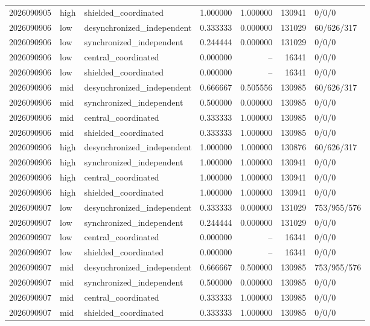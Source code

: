 \begin{longtable}{llp{38mm}rrrp{30mm}}
2026090905 & high & shielded\_coordinated & 1.000000 & 1.000000 & 130941 & 0/0/0 \\
2026090906 & low & desynchronized\_independent & 0.333333 & 0.000000 & 131029 & 60/626/317 \\
2026090906 & low & synchronized\_independent & 0.244444 & 0.000000 & 131029 & 0/0/0 \\
2026090906 & low & central\_coordinated & 0.000000 & -- & 16341 & 0/0/0 \\
2026090906 & low & shielded\_coordinated & 0.000000 & -- & 16341 & 0/0/0 \\
2026090906 & mid & desynchronized\_independent & 0.666667 & 0.505556 & 130985 & 60/626/317 \\
2026090906 & mid & synchronized\_independent & 0.500000 & 0.000000 & 130985 & 0/0/0 \\
2026090906 & mid & central\_coordinated & 0.333333 & 1.000000 & 130985 & 0/0/0 \\
2026090906 & mid & shielded\_coordinated & 0.333333 & 1.000000 & 130985 & 0/0/0 \\
2026090906 & high & desynchronized\_independent & 1.000000 & 1.000000 & 130876 & 60/626/317 \\
2026090906 & high & synchronized\_independent & 1.000000 & 1.000000 & 130941 & 0/0/0 \\
2026090906 & high & central\_coordinated & 1.000000 & 1.000000 & 130941 & 0/0/0 \\
2026090906 & high & shielded\_coordinated & 1.000000 & 1.000000 & 130941 & 0/0/0 \\
2026090907 & low & desynchronized\_independent & 0.333333 & 0.000000 & 131029 & 753/955/576 \\
2026090907 & low & synchronized\_independent & 0.244444 & 0.000000 & 131029 & 0/0/0 \\
2026090907 & low & central\_coordinated & 0.000000 & -- & 16341 & 0/0/0 \\
2026090907 & low & shielded\_coordinated & 0.000000 & -- & 16341 & 0/0/0 \\
2026090907 & mid & desynchronized\_independent & 0.666667 & 0.500000 & 130985 & 753/955/576 \\
2026090907 & mid & synchronized\_independent & 0.500000 & 0.000000 & 130985 & 0/0/0 \\
2026090907 & mid & central\_coordinated & 0.333333 & 1.000000 & 130985 & 0/0/0 \\
2026090907 & mid & shielded\_coordinated & 0.333333 & 1.000000 & 130985 & 0/0/0 \\

\end{longtable}
